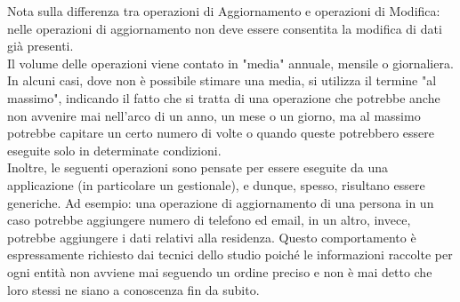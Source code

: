 \documentclass{elegantbook}
\begin{document}
	Nota sulla differenza tra operazioni di Aggiornamento e operazioni di Modifica: nelle operazioni di aggiornamento non deve essere consentita la modifica di dati già presenti.
	\\
	Il volume delle operazioni viene contato in "media" annuale, mensile o giornaliera. In alcuni casi, dove non è possibile stimare una media, si utilizza il termine "al massimo", indicando il fatto che si tratta di una operazione che potrebbe anche non avvenire mai nell'arco di un anno, un mese o un giorno, ma al massimo potrebbe capitare un certo numero di volte o quando queste potrebbero essere eseguite solo in determinate condizioni.
	\\
	Inoltre, le seguenti operazioni sono pensate per essere eseguite da una applicazione (in particolare un 
        gestionale), e dunque, spesso, risultano essere generiche. Ad esempio: una operazione di aggiornamento di 
        una persona in un caso potrebbe aggiungere numero di telefono ed email, in un altro, invece, potrebbe 
        aggiungere i dati relativi alla residenza. Questo comportamento è espressamente richiesto dai tecnici 
        dello studio poiché le informazioni raccolte per ogni entità non avviene mai seguendo un ordine preciso e 
        non è mai detto che loro stessi ne siano a conoscenza fin da subito.
\end{document}
